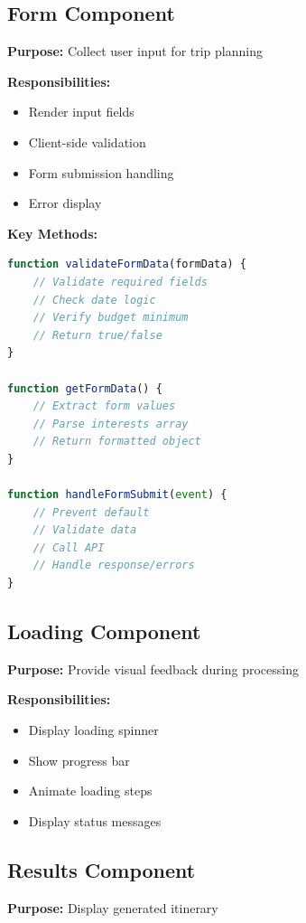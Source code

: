 \documentclass[12pt,a4paper]{report}
\begin{document}
\subsection{Form Component}

\textbf{Purpose:} Collect user input for trip planning

\textbf{Responsibilities:}
\begin{itemize}
    \item Render input fields
    \item Client-side validation
    \item Form submission handling
    \item Error display
\end{itemize}

\textbf{Key Methods:}
\begin{lstlisting}[language=JavaScript, style=pythonstyle, caption={Form Component Methods}]
function validateFormData(formData) {
    // Validate required fields
    // Check date logic
    // Verify budget minimum
    // Return true/false
}

function getFormData() {
    // Extract form values
    // Parse interests array
    // Return formatted object
}

function handleFormSubmit(event) {
    // Prevent default
    // Validate data
    // Call API
    // Handle response/errors
}
\end{lstlisting}

\subsection{Loading Component}

\textbf{Purpose:} Provide visual feedback during processing

\textbf{Responsibilities:}
\begin{itemize}
    \item Display loading spinner
    \item Show progress bar
    \item Animate loading steps
    \item Display status messages
\end{itemize}

\subsection{Results Component}

\textbf{Purpose:} Display generated itinerary
\end{document}
